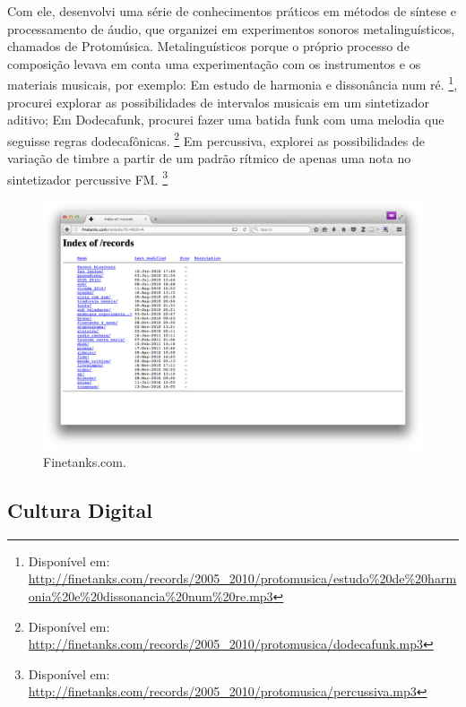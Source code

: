 Com ele, desenvolvi uma série de conhecimentos práticos em métodos de síntese e processamento de áudio, que organizei em experimentos sonoros metalinguísticos, chamados de Protomúsica. Metalinguísticos porque o próprio processo de composição levava em conta uma experimentação com os instrumentos e os materiais musicais, por exemplo:
Em estudo de harmonia e dissonância num ré. \footnote{Disponível em: \url{http://finetanks.com/records/2005_2010/protomusica/estudo\%20de\%20harmonia\%20e\%20dissonancia\%20num\%20re.mp3}}, procurei explorar as possibilidades de intervalos musicais em um sintetizador aditivo;
Em Dodecafunk, procurei fazer uma batida funk com uma melodia que seguisse regras dodecafônicas. \footnote{Disponível em: \url{http://finetanks.com/records/2005_2010/protomusica/dodecafunk.mp3}}
Em percussiva, explorei as possibilidades de variação de timbre a partir de um padrão rítmico de apenas uma nota no sintetizador percussive FM. \footnote{Disponível em: \url{http://finetanks.com/records/2005_2010/protomusica/percussiva.mp3}}



\begin{figure}

\includegraphics[width=1\textwidth]{pictures/cap1/finetanksrecords}
\caption{Finetanks.com.}
\label{fig:finetanks}
\end{figure}


\subsection{Cultura Digital}

